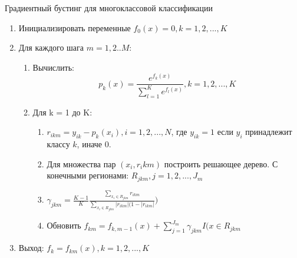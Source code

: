 \begin{algorithm}
  \caption{Градиентный бустинг для многоклассовой классификации}
  \label{gradient-boosting-algorithm}
  \begin{enumerate}
  \item Инициализировать переменные $f_0(x)=0, k=1,2,...,K$
  \item Для каждого шага $m=1,2 .. M$:
    \begin{enumerate}
      \item Вычислить:
      \begin{equation}
      	p_k(x)=\frac{e^{f_k(x)}}{\sum_{l=1}^{K}e^{f_l(x)}}, k=1,2,...,K
      \end{equation}
      \item Для k = 1 до K:
      \begin{enumerate}
      	\item $r_{ikm}=y_{ik}-p_k(x_i), i=1,2,...,N$, где $y_{ik}=1$ если $y_i$ принадлежит классу $k$, иначе 0.
      	\item Для множества пар $(x_i,r_ikm)$ построить решающее дерево. С конечными регионами: $R_{jkm}, j=1,2,...,J_m$
      	\item $\gamma_{jkm}=\frac{K-1}{K}\frac{\sum_{x_i\in R_{jkm}}r_{ikm}}{\sum_{x_i\in R_{jkm}}|r_{ikm}|(1-|r_{ikm}|})$
      	\item Обновить $f_{km}=f_{k,m-1}(x)+\sum_{j=1}^{J_m}\gamma_{jkm}I(x\in R_{jkm}$
      \end{enumerate}
    \end{enumerate}
    \item Выход: $f_k=f_{km}(x), k=1,2,...,K$
  \end{enumerate}
\end{algorithm}